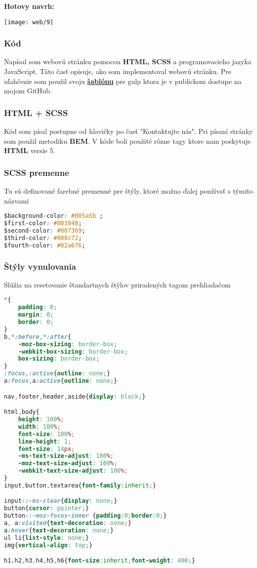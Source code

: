       \begin{center}
        \textbf{Hotovy navrh:}

        \texttt{[image: web/9]}
      \end{center}

      \subsubsection{Kód}
      Napísal som webovú stránku pomocou \textbf{HTML, SCSS} a programovacieho jazyka JavaScript. Táto časť opisuje, ako som implementoval webovú stránku.
      Pre uľahčenie som použil svoju \textbf{\href{https://github.com/SerMeliodas/gulp-template}{šablónu}} pre gulp ktora je v publickom dostupe na mojom GitHub.

      \subsubsection*{HTML + SCSS}

      Kód som písal postupne od hlavičky po časť "Kontaktujte nás". Pri písaní stránky som použil metodiku \textbf{BEM}.
      V kóde boli použité rôzne tagy ktore nam poskytuje \textbf{HTML} versie 5.

      \subsubsection*{SCSS premenne}
      Tu sú definované farebné premenné pre štýly, ktoré možno ďalej používať s týmito názvami
\begin{lstlisting}[language=css]
$background-color: #005a5b ;
$first-color: #003840;
$second-color: #007369;
$third-color: #008c72;
$fourth-color: #02a676;
\end{lstlisting}

      \subsubsection*{Štýly vynulovania} Slúžia na resetovanie štandartnych štýlov priradených tagom prehliadačom
\begin{lstlisting}[language=css]
*{
	padding: 0;
	margin: 0;
	border: 0;
}
b,*:before,*:after{
	-moz-box-sizing: border-box;
	-webkit-box-sizing: border-box;
	box-sizing: border-box;
}
:focus,:active{outline: none;}
a:focus,a:active{outline: none;}

nav,footer,header,aside{display: block;}

html,body{
	height: 100%;
	width: 100%;
	font-size: 100%;
	line-height: 1;
	font-size: 14px;
	-ms-text-size-adjust: 100%;
	-moz-text-size-adjust: 100%;
	-webkit-text-size-adjust: 100%;
}
input,button,textarea{font-family:inherit;}

input::-ms-clear{display: none;}
button{cursor: pointer;}
button::-moz-focus-inner {padding:0;border:0;}
a, a:visited{text-decoration: none;}
a:hover{text-decoration: none;}
ul li{list-style: none;}
img{vertical-align: top;}

h1,h2,h3,h4,h5,h6{font-size:inherit;font-weight: 400;}
\end{lstlisting}

